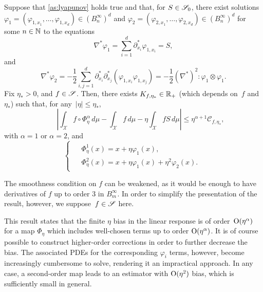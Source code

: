 \begin{proposition}
\label{prop:gen_subtraction}
%
Suppose that \cref{as:lyapunov} holds true and that, for $S\in\S_0$, there exist solutions $\varphi_1 = (\varphi_{1,x_1},\dotsc,\varphi_{1,x_d}) \in (B^\infty_n)^d$ and $\varphi_2=(\varphi_{2,x_1},\dotsc,\varphi_{2,x_d}) \in (B^\infty_n)^d$ for some $n\in\N$ to the equations
%
\begin{equation}
	\nabla^*\varphi_1 = \sum_{i=1}^d \partial_{x_i}^* \varphi_{1,x_i} = S, %
	\label{eq:varphi1_PDE}
\end{equation}
%
and
%
\begin{equation}
	\nabla^*\varphi_2 = -\frac{1}{2}\sum_{i,j=1}^d \partial_{x_i}^*\partial_{x_j}^* (\varphi_{1,x_i}\varphi_{1,x_j}) = -\frac{1}{2}(\nabla^*)^2 \colon \varphi_1\otimes \varphi_1.
	\label{eq:varphi2_PDE}
\end{equation}
%
Fix $\eta_*>0$, and $f\in \S$. Then, there exists $K_{f,\eta_*} \in\R_+$ (which depends on~$f$ and~$\eta_*$) such that, for any~$|\eta| \leq \eta_*$,
%
\begin{equation}
	\qquad \left|\int_\mathcal{X} f\circ\Phi^\alpha_\eta \, d\mu - \int_\mathcal{X} f \, d\mu - \eta\int_\mathcal{X} f S \, d\mu\right| \leq \eta^{\alpha+1} \mathcal{C}_{f,\eta_*},
	\label{eq:prop_eta_bias_bound}
\end{equation}
%
with $\alpha=1$ or $\alpha=2$, and
%
\begin{equation}
\begin{cases}
\begin{aligned}
	&\Phi_\eta^1(x) = x + \eta\varphi_1(x), \\
	&\Phi_\eta^2(x) = x + \eta\varphi_1(x) + \eta^2\varphi_2(x).
\end{aligned}
\end{cases}
\label{eq:Phi_alpha}
\end{equation}
%
\end{proposition}

\begin{remark}
The smoothness condition on $f$ can be weakened, as it would be enough to have derivatives of $f$ up to order 3 in $B^\infty_m$. In order to simplify the presentation of the result, however, we suppose~$f\in \S$ here.
\end{remark}

This result states that the finite $\eta$ bias in the linear response is of order~$\bigO(\eta^{\alpha})$ for a map $\Phi_\eta$ which includes well-chosen terms up to order $\bigO(\eta^\alpha)$. It is of course possible to construct higher-order corrections in order to further decrease the bias. The associated PDEs for the corresponding $\varphi_i$ terms, however, become increasingly cumbersome to solve, rendering it an impractical approach. In any case, a second-order map leads to an estimator with $\bigO(\eta^2)$ bias, which is sufficiently small in general.

